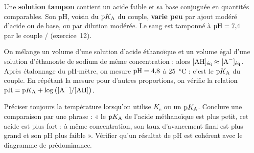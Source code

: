 \begin{definition}
Une \textbf{solution tampon} contient un acide faible et sa base conjuguée en quantités comparables. Son pH, voisin du
$\mathrm{p}K_{\mathrm{A}}$ du couple, \textbf{varie peu} par ajout modéré d'acide ou de base, ou par dilution modérée. Le sang est tamponné
à $\mathrm{pH}=7{,}4$ par le couple / (exercice~12).
\end{definition}
\begin{experience}
On mélange un volume d'une solution d'acide éthanoïque et un volume égal d'une solution d'éthanoate de sodium de même
concentration : alors $[\ce{AH}]_\text{éq}\approx[\ce{A-}]_\text{éq}$. Après étalonnage du pH-mètre, on mesure
$\mathrm{pH}=4{,}8$ à 25~°C : c'est le $\mathrm{p}K_{\mathrm{A}}$ du couple. En répétant la mesure pour d'autres proportions, on vérifie la relation
$\pH=\pKa+\log\left([\ce{A-}]/[\ce{AH}]\right)$.
\end{experience}
\begin{rediger}
Préciser toujours la température lorsqu'on utilise $K_\mathrm{e}$ ou un $\mathrm{p}K_{\mathrm{A}}$. Conclure une comparaison par une phrase :
« le $\mathrm{p}K_{\mathrm{A}}$ de l'acide méthanoïque est plus petit, cet acide est plus fort : à même concentration, son taux d'avancement
final est plus grand et son pH plus faible ». Vérifier qu'un résultat de pH est cohérent avec le diagramme de
prédominance.
\end{rediger}
\exercices

